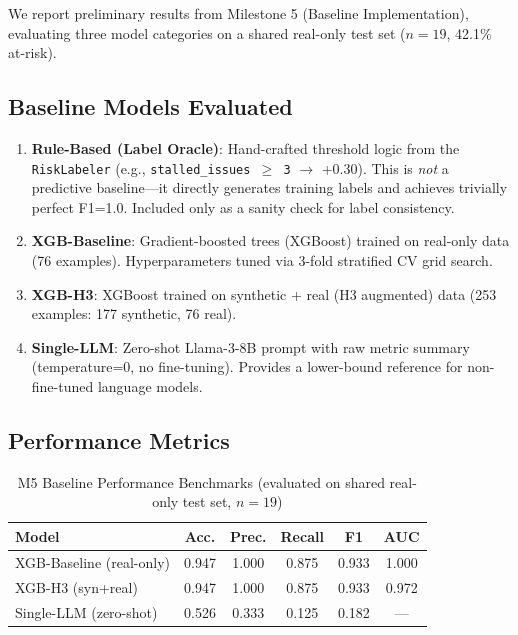 \documentclass[journal]{IEEEtran}
\begin{document}
We report preliminary results from Milestone 5 (Baseline Implementation), evaluating three model categories on a shared real-only test set ($n=19$, 42.1\% at-risk).

\subsection{Baseline Models Evaluated}

\begin{enumerate}
    \item \textbf{Rule-Based (Label Oracle)}: Hand-crafted threshold logic from the \texttt{RiskLabeler} (e.g., \texttt{stalled\_issues $\geq$ 3} $\rightarrow$ +0.30). This is \textit{not} a predictive baseline---it directly generates training labels and achieves trivially perfect F1=1.0. Included only as a sanity check for label consistency.
    \item \textbf{XGB-Baseline}: Gradient-boosted trees (XGBoost) trained on real-only data (76 examples). Hyperparameters tuned via 3-fold stratified CV grid search.
    \item \textbf{XGB-H3}: XGBoost trained on synthetic + real (H3 augmented) data (253 examples: 177 synthetic, 76 real).
    \item \textbf{Single-LLM}: Zero-shot Llama-3-8B prompt with raw metric summary (temperature=0, no fine-tuning). Provides a lower-bound reference for non-fine-tuned language models.
\end{enumerate}

\subsection{Performance Metrics}

\begin{table}[htbp]
\centering
\caption{M5 Baseline Performance Benchmarks (evaluated on shared real-only test set, $n=19$)}
\label{tab:results}
\begin{tabular}{l|c|c|c|c|c}
\toprule
\textbf{Model} & \textbf{Acc.} & \textbf{Prec.} & \textbf{Recall} & \textbf{F1} & \textbf{AUC} \\
\midrule
XGB-Baseline (real-only) & 0.947 & 1.000 & 0.875 & 0.933 & 1.000 \\
XGB-H3 (syn+real) & 0.947 & 1.000 & 0.875 & 0.933 & 0.972 \\
Single-LLM (zero-shot) & 0.526 & 0.333 & 0.125 & 0.182 & --- \\
\bottomrule
\end{tabular}
\end{table}
\end{document}

